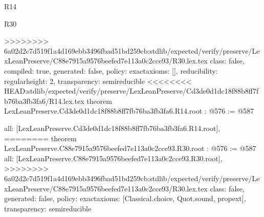 \begin{lexlean}{R14}
\begin{lexlean}{R30}
\begin{coremodule}
{{{{{>>>>>>>> 6a02d2c7d519f1a4d169ebb3496fbad51bd259cb:stdlib/expected/verify/preserve/LexLeanPreserve/C88e7915a9576beefed7e113a0c2cce93/R30.lex.tex
  class: false,
  compiled: true,
  generated: false,
  policy: exact{axioms: []},
  reducibility: regular{height: 2},
  transparency: semireducible
}
<<<<<<<< HEAD:stdlib/expected/verify/preserve/LexLeanPreserve/Cd3de0d1dc18f88b8ff7fb76ba3fb3fa6/R14.lex.tex
theorem LexLeanPreserve.Cd3de0d1dc18f88b8ff7fb76ba3fb3fa6.R14.root : @576 := @587 {
  all: [LexLeanPreserve.Cd3de0d1dc18f88b8ff7fb76ba3fb3fa6.R14.root],
========
theorem LexLeanPreserve.C88e7915a9576beefed7e113a0c2cce93.R30.root : @576 := @587 {
  all: [LexLeanPreserve.C88e7915a9576beefed7e113a0c2cce93.R30.root],
>>>>>>>> 6a02d2c7d519f1a4d169ebb3496fbad51bd259cb:stdlib/expected/verify/preserve/LexLeanPreserve/C88e7915a9576beefed7e113a0c2cce93/R30.lex.tex
  class: false,
  generated: false,
  policy: exact{axioms: [Classical.choice, Quot.sound, propext]},
  transparency: semireducible
}

}}}}}
\end{coremodule}
\end{lexlean}
\end{lexlean}
